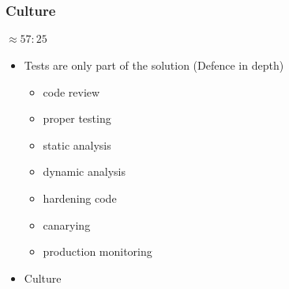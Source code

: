 




\begin{frame}[fragile,t]
\frametitle{Culture}
\framesubtitle{$\approx 57:25$}
\begin{itemize}
\item Tests are only part of the solution (Defence in depth)
\begin{itemize}
\item code review
\item proper testing
\item static analysis
\item dynamic analysis
\item hardening code
\item canarying
\item production monitoring
\end{itemize}

\item Culture
\end{itemize}


\end{frame}

